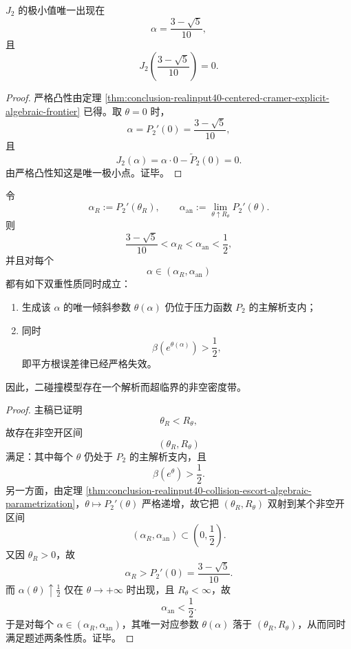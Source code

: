 \begin{corollary}\label{cor:conclusion-realinput40-centered-cramer-minimum-at-alpha0}
\(J_2\) 的极小值唯一出现在
\[
\alpha=\frac{3-\sqrt5}{10},
\]
且
\[
J_2\!\left(\frac{3-\sqrt5}{10}\right)=0.
\]
\end{corollary}
\begin{proof}
严格凸性由定理 \ref{thm:conclusion-realinput40-centered-cramer-explicit-algebraic-frontier} 已得。取 \(\theta=0\) 时，
\[
\alpha=P_2'(0)=\frac{3-\sqrt5}{10},
\]
且
\[
J_2(\alpha)=\alpha\cdot 0-\widetilde P_2(0)=0.
\]
由严格凸性知这是唯一极小点。证毕。
\end{proof}

\begin{theorem}[解析而超临界的密度带]\label{thm:conclusion-realinput40-analytic-supercritical-density-band}
令
\[
\alpha_R:=P_2'(\theta_R),
\qquad
\alpha_{\mathrm{an}}:=\lim_{\theta\uparrow R_\theta}P_2'(\theta).
\]
则
\[
\frac{3-\sqrt5}{10}<\alpha_R<\alpha_{\mathrm{an}}<\frac12,
\]
并且对每个
\[
\alpha\in(\alpha_R,\alpha_{\mathrm{an}})
\]
都有如下双重性质同时成立：
\begin{enumerate}
  \item 生成该 \(\alpha\) 的唯一倾斜参数 \(\theta(\alpha)\) 仍位于压力函数 \(P_2\) 的主解析支内；
  \item 同时
  \[
  \beta(e^{\theta(\alpha)})>\frac12,
  \]
  即平方根误差律已经严格失效。
\end{enumerate}
因此，二碰撞模型存在一个解析而超临界的非空密度带。
\end{theorem}
\begin{proof}
主稿已证明
\[
\theta_R<R_\theta,
\]
故存在非空开区间
\[
(\theta_R,R_\theta)
\]
满足：其中每个 \(\theta\) 仍处于 \(P_2\) 的主解析支内，且
\[
\beta(e^\theta)>\frac12.
\]
另一方面，由定理 \ref{thm:conclusion-realinput40-collision-escort-algebraic-parametrization}，\(\theta\mapsto P_2'(\theta)\) 严格递增，故它把 \((\theta_R,R_\theta)\) 双射到某个非空开区间
\[
(\alpha_R,\alpha_{\mathrm{an}})\subset\left(0,\frac12\right).
\]
又因 \(\theta_R>0\)，故
\[
\alpha_R>P_2'(0)=\frac{3-\sqrt5}{10}.
\]
而 \(\alpha(\theta)\uparrow \frac12\) 仅在 \(\theta\to+\infty\) 时出现，且 \(R_\theta<\infty\)，故
\[
\alpha_{\mathrm{an}}<\frac12.
\]
于是对每个 \(\alpha\in(\alpha_R,\alpha_{\mathrm{an}})\)，其唯一对应参数 \(\theta(\alpha)\) 落于 \((\theta_R,R_\theta)\)，从而同时满足题述两条性质。证毕。
\end{proof}

